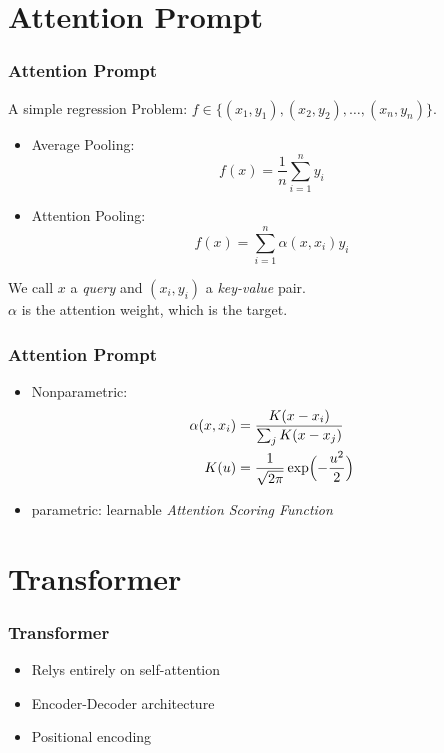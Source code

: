 \documentclass[]{beamer}
\begin{document}
\section{Attention Prompt}
\begin{frame}
    \frametitle{Attention Prompt}
    A simple regression Problem: $f \in \{(x_1, y_1), (x_2, y_2), \ldots, (x_n, y_n)\}$.
    \begin{itemize}[label = \textbullet]
        \item Average Pooling: 
            \[f(x) = \frac{1}{n} \sum_{i=1}^n y_i\]
        \item Attention Pooling: 
            \[f(x) = \sum_{i=1}^n \alpha(x, x_i) y_i \]
    \end{itemize}
    We call $x$ a \emph{query} and $(x_i, y_i)$ a \emph{key-value} pair. \\
    $\alpha$ is the attention weight, which is the target.
\end{frame}
\begin{frame}
    \frametitle{Attention Prompt}
    \begin{itemize}[label=\textbullet]
        \item Nonparametric: 
            \begin{align*}
                \alpha(x, x_i) &= \frac{K(x-x_i)}{\sum_{j} K(x-x_j)} \\
                K(u) &= \frac{1}{\sqrt{2\pi}} \exp \Bigl(-\frac{u^2}{2}\Bigr)
            \end{align*}
        \item parametric: learnable \emph{Attention Scoring Function}
    \end{itemize}
\end{frame}

\section{Transformer}
\begin{frame}
    \frametitle{Transformer}
    \begin{itemize}[label = \textbullet]
        \item Relys entirely on self-attention
        \item Encoder-Decoder architecture
        \item Positional encoding
    \end{itemize}
\end{frame}
\end{document}
